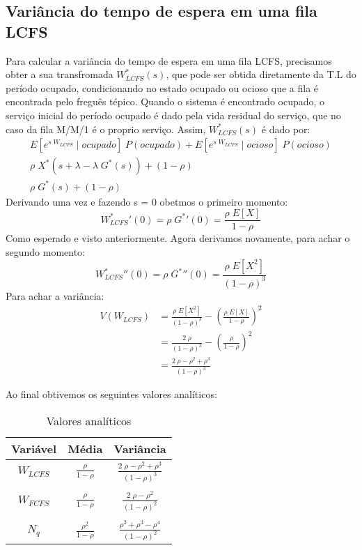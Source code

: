 \documentclass[a4paper]{article}
\newcommand{\E}[1]{E\!\left[#1\right]}
\begin{document}
\subsection{Variância do tempo de espera em uma fila LCFS}
Para calcular a variância do tempo de espera em uma fila LCFS, precisamos obter
a sua transfromada \(W_{LCFS}^*(s)\), que pode ser obtida diretamente da T.L
do período ocupado, condicionando no estado ocupado ou ocioso que a fila  é encontrada pelo freguês tépico.
Quando o sistema é encontrado ocupado, o serviço inicial do período ocupado  é dado pela vida residual do
serviço, que no caso da fila M/M/1 é o proprio serviço.
Assim, \(W_{LCFS}^*(s)\) é dado por:
\begin{align*}
    \E{e^{s \; W_{LCFS}} \;|\; ocupado} \; P(ocupado)
        + \E{e^{s \; W_{LCFS}} \;|\; ocioso} \; P(ocioso) \\
    \rho \; X^*(s + \lambda - \lambda \; G^*(s)) + (1 - \rho) \\
    \rho \; G^*(s) + (1 - \rho)
\end{align*}
Derivando uma vez e fazendo s = 0 obetmos o primeiro momento:
\[
    {W_{LCFS}^*}'(0)
        = \rho \; {G^*}'(0) = \frac{\rho \; \E{X}}{1 - \rho}
\]
Como esperado e visto anteriormente. Agora derivamos novamente, para achar o segundo momento:
\[
    {W_{LCFS}^*}''(0)
        = \rho \; {G^*}''(0)
        = \frac{\rho \; \E{X^2}}{(1 - \rho)^3}
\]
Para achar a variância:
\begin{align*}
    V(W_{LCFS}) &=
        \frac{\rho \; \E{X^2}}{(1 - \rho)^3}
        - \left( \frac{\rho \; \E{X}}{1-\rho} \right)^2 \\
    &= \frac{2 \; \rho}{(1 - \rho)^3}
        - \left( \frac{\rho}{1 - \rho} \right)^2 \\
    &= \frac{2 \; \rho - \rho^2 + \rho^3}{(1 - \rho)^3}
\end{align*}

Ao final obtivemos os seguintes valores analíticos:
\begin{table}[h]
\centering
    \begin{tabular}{|c|cc|}\hline
        Variável & Média & Variância \\\hline
        $ W_{LCFS} $&$ \frac{\rho}{1-\rho} $&$
            \frac{2 \; \rho - \rho^2 + \rho^3}{(1-\rho)^3} $\\&&\\
        $ W_{FCFS} $&$ \frac{\rho}{1-\rho} $&$
            \frac{2 \; \rho - \rho^2}{(1 - \rho)^2} $\\&&\\
        $ N_q      $&$ \frac{\rho^2}{1 - \rho} $&$
            \frac{\rho^2 + \rho^3 - \rho^4}{(1 - \rho)^2} $\\\hline
    \end{tabular}
\caption{Valores analíticos}
\end{table}
\end{document}
